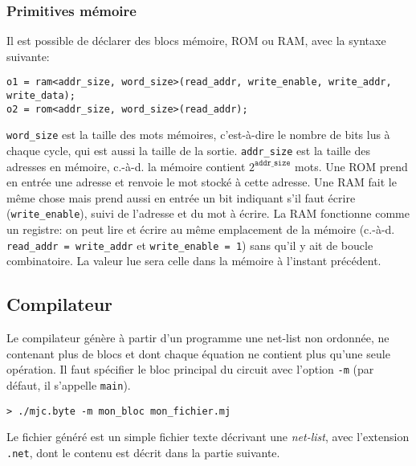 \documentclass[a4paper]{article}
\begin{document}
\subsubsection*{Primitives mémoire}

Il est possible de déclarer des blocs mémoire, ROM ou RAM, avec la syntaxe suivante:
\begin{lstlisting}
o1 = ram<addr_size, word_size>(read_addr, write_enable, write_addr, write_data);
o2 = rom<addr_size, word_size>(read_addr);
\end{lstlisting}
\lstinline+word_size+ est la taille des mots mémoires, c'est-à-dire le 
nombre de bits lus à chaque cycle, qui est aussi la taille de la sortie. 
\lstinline+addr_size+ est la taille des adresses en mémoire, c.-à-d. la 
mémoire contient $2^{\mathtt{addr\_size}}$ mots. Une ROM prend en entrée une 
adresse et renvoie le mot stocké à cette adresse. Une RAM fait le même chose 
mais prend aussi en entrée un bit indiquant s'il faut écrire 
(\texttt{write\_enable}), suivi de l'adresse et du mot à écrire. La RAM 
fonctionne comme un registre: on peut lire et écrire au même emplacement de 
la mémoire (c.-à-d. \lstinline+read_addr = write_addr+ et 
\lstinline+write_enable = 1+) sans qu'il y ait de boucle combinatoire.  La 
valeur lue sera celle dans la mémoire à l'instant précédent.


\subsection{Compilateur}

%
%
%

Le compilateur \minijazz{} génère à partir d'un programme une net-list non ordonnée, ne contenant plus de blocs et dont chaque équation ne contient plus qu'une seule opération. Il faut spécifier le bloc principal du circuit avec l'option \texttt{-m} (par défaut, il s'appelle \texttt{main}).
\begin{verbatim}
> ./mjc.byte -m mon_bloc mon_fichier.mj
\end{verbatim}
Le fichier généré est un simple fichier texte décrivant une \emph{net-list}, avec l'extension \texttt{.net}, dont le contenu est décrit dans la partie suivante. 
\end{document}
